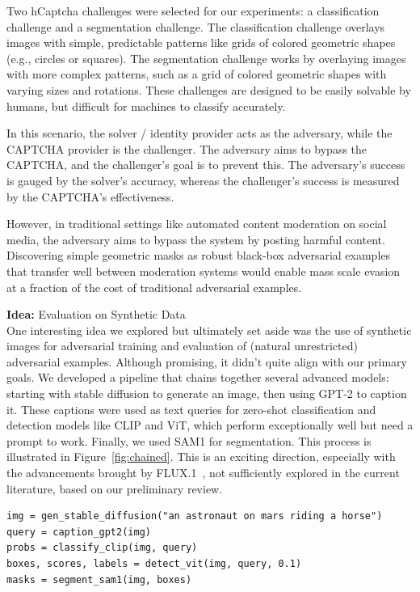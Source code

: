 \documentclass[a4paper, oneside]{discothesis}
\begin{document}
Two hCaptcha challenges were selected for our experiments: a classification challenge and a segmentation challenge. The classification challenge overlays images with simple, predictable patterns like grids of colored geometric shapes (e.g., circles or squares). The segmentation challenge works by overlaying images with more complex patterns, such as a grid of colored geometric shapes with varying sizes and rotations. These challenges are designed to be easily solvable by humans, but difficult for machines to classify accurately.

In this scenario, the solver / identity provider acts as the adversary, while the CAPTCHA provider is the challenger. The adversary aims to bypass the CAPTCHA, and the challenger's goal is to prevent this. The adversary's success is gauged by the solver's accuracy, whereas the challenger's success is measured by the CAPTCHA's effectiveness. 

However, in traditional settings like automated content moderation on social media, the adversary aims to bypass the system by posting harmful content. Discovering simple geometric masks as robust black-box adversarial examples that transfer well between moderation systems would enable mass scale evasion at a fraction of the cost of traditional adversarial examples.

\begin{highlightbox}
	\textbf{Idea:} Evaluation on Synthetic Data \\

	One interesting idea we explored but ultimately set aside was the use of synthetic images for adversarial training and evaluation of (natural unrestricted) adversarial examples. Although promising, it didn't quite align with our primary goals. We developed a pipeline that chains together several advanced models: starting with stable diffusion to generate an image, then using GPT-2 to caption it. These captions were used as text queries for zero-shot classification and detection models like CLIP and ViT, which perform exceptionally well but need a prompt to work. Finally, we used SAM1 for segmentation. This process is illustrated in Figure~\ref{fig:chained}. This is an exciting direction, especially with the advancements brought by FLUX.1~\cite{BlackForestLabs2024FLUX}, not sufficiently explored in the current literature, based on our preliminary review. \\

\begin{verbatim}
img = gen_stable_diffusion("an astronaut on mars riding a horse")
query = caption_gpt2(img)
probs = classify_clip(img, query)
boxes, scores, labels = detect_vit(img, query, 0.1)
masks = segment_sam1(img, boxes)
\end{verbatim}
\end{highlightbox}
\end{document}

